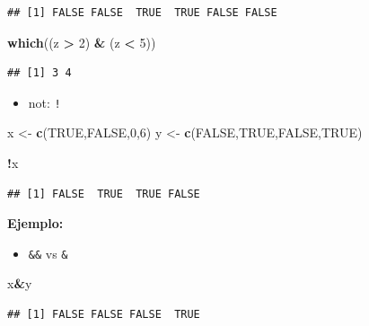 \documentclass[]{book}
\newenvironment{Shaded}{\begin{snugshade}}{\end{snugshade}}
\newcommand{\KeywordTok}[1]{\textcolor[rgb]{0.13,0.29,0.53}{\textbf{#1}}}
\newcommand{\DecValTok}[1]{\textcolor[rgb]{0.00,0.00,0.81}{#1}}
\newcommand{\StringTok}[1]{\textcolor[rgb]{0.31,0.60,0.02}{#1}}
\newcommand{\OtherTok}[1]{\textcolor[rgb]{0.56,0.35,0.01}{#1}}
\newcommand{\OperatorTok}[1]{\textcolor[rgb]{0.81,0.36,0.00}{\textbf{#1}}}
\newcommand{\NormalTok}[1]{#1}
\providecommand{\tightlist}{%
  \setlength{\itemsep}{0pt}\setlength{\parskip}{0pt}}
\begin{document}
\begin{verbatim}
## [1] FALSE FALSE  TRUE  TRUE FALSE FALSE
\end{verbatim}

\begin{Shaded}
\begin{Highlighting}[]
\KeywordTok{which}\NormalTok{((z }\OperatorTok{>}\StringTok{ }\DecValTok{2}\NormalTok{) }\OperatorTok{&}\StringTok{ }\NormalTok{(z }\OperatorTok{<}\StringTok{ }\DecValTok{5}\NormalTok{))}
\end{Highlighting}
\end{Shaded}

\begin{verbatim}
## [1] 3 4
\end{verbatim}

\begin{itemize}
\tightlist
\item
  not: \texttt{!}
\end{itemize}

\begin{Shaded}
\begin{Highlighting}[]
\NormalTok{x <-}\StringTok{ }\KeywordTok{c}\NormalTok{(}\OtherTok{TRUE}\NormalTok{,}\OtherTok{FALSE}\NormalTok{,}\DecValTok{0}\NormalTok{,}\DecValTok{6}\NormalTok{)}
\NormalTok{y <-}\StringTok{ }\KeywordTok{c}\NormalTok{(}\OtherTok{FALSE}\NormalTok{,}\OtherTok{TRUE}\NormalTok{,}\OtherTok{FALSE}\NormalTok{,}\OtherTok{TRUE}\NormalTok{)}

\OperatorTok{!}\NormalTok{x}
\end{Highlighting}
\end{Shaded}

\begin{verbatim}
## [1] FALSE  TRUE  TRUE FALSE
\end{verbatim}

\textbf{Ejemplo:}

\begin{itemize}
\tightlist
\item
  \texttt{\&\&} vs \texttt{\&}
\end{itemize}

\begin{Shaded}
\begin{Highlighting}[]
\NormalTok{x}\OperatorTok{&}\NormalTok{y}
\end{Highlighting}
\end{Shaded}

\begin{verbatim}
## [1] FALSE FALSE FALSE  TRUE
\end{verbatim}
\end{document}
